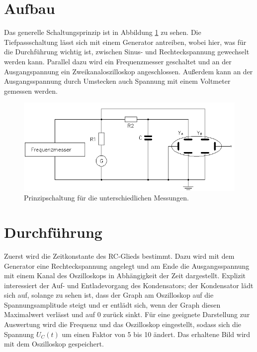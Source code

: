 \section{Aufbau}
\label{sec:Aufbau}
Das generelle Schaltungsprinzip ist in Abbildung \ref{fig:bild3} zu sehen.\newline
Die Tiefpassschaltung lässt sich mit einem Generator antreiben, wobei hier, was
für die Durchführung wichtig ist, zwischen Sinus- und Rechteckspannung gewechselt werden kann.\newline
Parallel dazu wird ein Frequenzmesser geschaltet und an der Ausgangspannung ein Zweikanaloszilloskop angeschlossen.\newline
Außerdem kann an der Ausgangsspannung durch Umstecken auch Spannung mit einem Voltmeter gemessen werden.\newline
\begin{figure}[H]
  \centering
  \includegraphics[scale=0.8]{bilder/bild33.png}
  \caption{Prinzipschaltung für die unterschiedlichen Messungen.}
  \label{fig:bild3}
\end{figure}
\section{Durchführung}
\label{sec:Durchführung}
Zuerst wird die Zeitkonstante des RC-Glieds bestimmt. Dazu wird mit dem Generator eine
Rechteckspannung angelegt und am Ende die Ausgangsspannung mit einem Kanal des Oszilloskops in Abhängigkeit der Zeit dargestellt.\newline
Explizit interessiert der Auf- und Entladevorgang des Kondensators; der Kondensator lädt sich auf, solange zu sehen ist, dass der Graph am Oszilloskop auf die Spannungsamplitude
steigt und er entlädt sich, wenn der Graph diesen Maximalwert verlässt und auf 0 zurück sinkt.\newline
Für eine geeignete Darstellung zur Auswertung wird die Frequenz und das Oszilloskop eingestellt, sodass sich die Spannung $U_C(t)$ um einen Faktor von 5
bis 10 ändert.\newline
Das erhaltene Bild wird mit dem Oszilloskop gespeichert.\\


